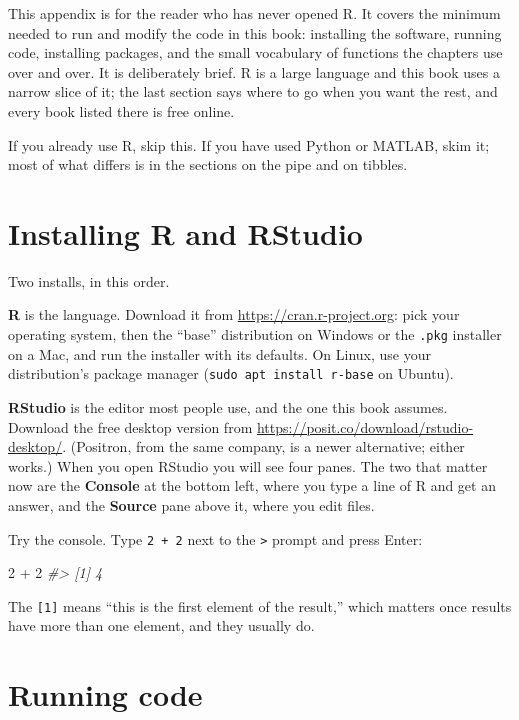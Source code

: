 \documentclass[
  10.5pt,
  letterpaper,
]{scrbook}
\newenvironment{Shaded}{\begin{snugshade}}{\end{snugshade}}
\newcommand{\CommentTok}[1]{\textcolor[rgb]{0.00,0.00,0.00}{\textit{#1}}}
\newcommand{\DecValTok}[1]{\textcolor[rgb]{0.00,0.00,0.00}{#1}}
\newcommand{\SpecialCharTok}[1]{\textcolor[rgb]{0.00,0.00,0.00}{#1}}
\theoremstyle{plain}
\theoremstyle{remark}
\begin{document}
This appendix is for the reader who has never opened R. It covers the
minimum needed to run and modify the code in this book: installing the
software, running code, installing packages, and the small vocabulary of
functions the chapters use over and over. It is deliberately brief. R is
a large language and this book uses a narrow slice of it; the last
section says where to go when you want the rest, and every book listed
there is free online.

If you already use R, skip this. If you have used Python or MATLAB, skim
it; most of what differs is in the sections on the pipe and on tibbles.

\section{Installing R and RStudio}\label{installing-r-and-rstudio}

Two installs, in this order.

\textbf{R} is the language. Download it from
\url{https://cran.r-project.org}: pick your operating system, then the
``base'' distribution on Windows or the \texttt{.pkg} installer on a
Mac, and run the installer with its defaults. On Linux, use your
distribution's package manager (\texttt{sudo\ apt\ install\ r-base} on
Ubuntu).

\textbf{RStudio} is the editor most people use, and the one this book
assumes. Download the free desktop version from
\url{https://posit.co/download/rstudio-desktop/}. (Positron, from the
same company, is a newer alternative; either works.) When you open
RStudio you will see four panes. The two that matter now are the
\textbf{Console} at the bottom left, where you type a line of R and get
an answer, and the \textbf{Source} pane above it, where you edit files.

Try the console. Type \texttt{2\ +\ 2} next to the
\texttt{\textgreater{}} prompt and press Enter:

\begin{Shaded}
\begin{Highlighting}[]
\DecValTok{2} \SpecialCharTok{+} \DecValTok{2}
\CommentTok{\#\textgreater{} [1] 4}
\end{Highlighting}
\end{Shaded}

The \texttt{{[}1{]}} means ``this is the first element of the result,''
which matters once results have more than one element, and they usually
do.

\section{Running code}\label{running-code}
\end{document}
